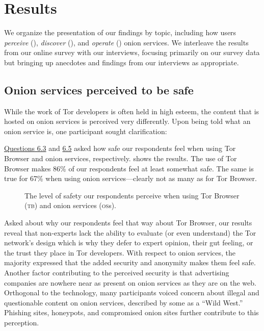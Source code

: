 \section{Results}
\label{sec:results}

We organize the presentation of our findings by topic, including how users
\emph{perceive} (), \emph{discover} (),
and \emph{operate} () onion services.  We interleave the
results from our online survey with our interviews, focusing primarily on our
survey data but bringing up anecdotes and findings from our interviews as
appropriate.

\subsection{Onion services perceived to be safe}
\label{sec:perception}

While the work of Tor developers is often held in high esteem, the content that
is hosted on onion services is perceived very differently.  Upon being told what
an onion service is, one participant sought clarification: 

\hyperref[q6_3]{Questions 6.3} and \hyperref[q6_5]{6.5} asked how safe our
respondents feel when using Tor Browser and onion services, respectively.
 shows the results.  The use of Tor Browser makes
86\% of our respondents feel at least somewhat safe.  The same is true for 67\%
when using onion services---clearly not as many as for Tor Browser.

\begin{figure}[t]
    \centering
    
    \caption{The level of safety our respondents perceive when using Tor
    Browser (\textsc{tb}) and onion services (\textsc{os}s).}
    \label{fig:perceived-security}
\end{figure}

Asked about why our respondents feel that way about Tor Browser, our results
reveal that non-experts lack the ability to evaluate (or even understand) the
Tor network's design which is why they defer to expert opinion, their gut
feeling, or the trust they place in Tor developers.  With respect to onion
services, the majority expressed that the added security and anonymity makes
them feel safe.  Another factor contributing to the perceived security is that
advertising companies are nowhere near as present on onion services as they are
on the web.  Orthogonal to the technology, many participants voiced concern
about illegal and questionable content on onion services, described by some as a
``Wild West.'' Phishing sites, honeypots, and compromised onion sites further
contribute to this perception.


